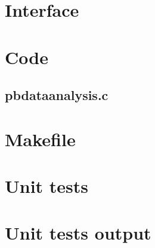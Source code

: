 \section{Interface}

\begin{scriptsize}
\begin{ttfamily}

\end{ttfamily}
\end{scriptsize}

\section{Code}

\subsection{pbdataanalysis.c}

\begin{scriptsize}
\begin{ttfamily}

\end{ttfamily}
\end{scriptsize}

\section{Makefile}

\begin{scriptsize}
\begin{ttfamily}

\end{ttfamily}
\end{scriptsize}

\section{Unit tests}

\begin{scriptsize}
\begin{ttfamily}

\end{ttfamily}
\end{scriptsize}

\section{Unit tests output}

